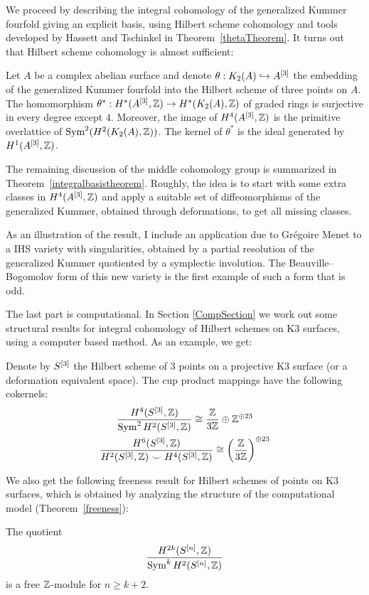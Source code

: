 We proceed by describing the integral cohomology of the generalized Kummer fourfold giving an explicit basis, using Hilbert scheme cohomology and tools developed by Hassett and Tschinkel in Theorem~\ref{thetaTheorem}. It turns out that Hilbert scheme cohomology is almost sufficient:
\begin{theorem}
Let $A$ be a complex abelian surface and denote $\theta: \kum{A}{2}\hookrightarrow A^{[3]}$ the embedding of the generalized Kummer fourfold into the Hilbert scheme of three points on $A$.
The homomorphism $\theta^*:H^*(A\hilb{3},\Z)\rightarrow H^*(\kum{A}{2},\Z)$ of graded rings is surjective in every degree except $4$. Moreover, the image of $H^4(A\hilb{3},\Z)$ is the primitive overlattice of $\Sym^2(H^2(\kum{A}{2},\Z))$. 
The kernel of $\theta^*$ is the ideal generated by $H^1(A\hilb{3},\Z)$.
\end{theorem}
The remaining discussion of the middle cohomology group is summarized in Theorem~\ref{integralbasistheorem}. Roughly, the idea is to start with some extra classes in $H^4(A\hilb{3},\Z)$ and apply a suitable set of diffeomorphisms of the generalized Kummer, obtained through deformations, to get all missing classes.

As an illustration of the result, I include an application due to Gr\'egoire Menet to a IHS variety with singularities, obtained by a partial resolution of the generalized Kummer quotiented by a symplectic involution. The Beauville--Bogomolov form of this new variety is the first example of such a form that is odd.

The last part \cite{Kapfer2} is computational. In Section \ref{CompSection} we work out some structural results for integral cohomology of Hilbert schemes on K3 surfaces, using a computer based method. As an example, we get:
\begin{theorem}
Denote by $S\hilb{3}$ the Hilbert scheme of 3 points on a projective K3 surface (or a deformation equivalent space).
The cup product mappings have the following cokernels:
\begin{gather*}
\frac{H^4(S\hilb{3},\IZ)}{\Sym^2 H^2(S\hilb{3},\IZ)}  \cong \frac{\IZ}{3\IZ} \oplus \IZ^ {\oplus 23}\\
\frac{H^6(S\hilb{3},\IZ)}{H^2(S\hilb{3},\IZ)\smile H^4(S\hilb{3},\IZ)} \cong \left(\frac{\IZ}{3\IZ}\right)^{\oplus 23}
\end{gather*}
\end{theorem}
We also get the following freeness result for Hilbert schemes of points on K3 surfaces, which is obtained by analyzing the structure of the computational model (Theorem~\ref{freeness}):
\begin{theorem}
The quotient
$$
 \frac{H^{2k}(S\hilb{n},\IZ)}{\Sym^k H^{2}(S\hilb{n},\IZ)}
$$
is a free $\IZ$-module for $n\geq k+2$.
\end{theorem}

